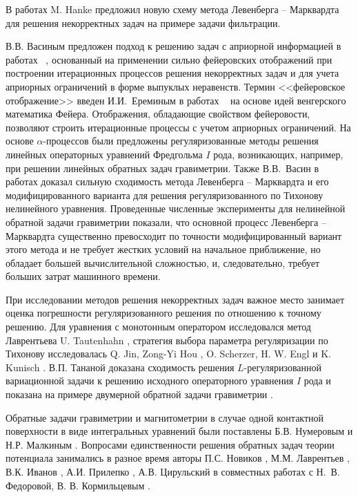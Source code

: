 {В работах \cite{Han1997,Han2010} M. Hanke предложил новую схему метода Левенберга -- Марквардта для решения некорректных задач на примере задачи фильтрации.

В.В. Васиным предложен подход к решению задач с априорной информацией в работах ~\cite{Vas1982, Vas1988,VasAge1993, VasEre2009}, основанный на применении сильно фейеровских отображений при построении итерационных процессов решения некорректных задач и для учета априорных ограничений в форме выпуклых неравенств. Термин <<фейеровское отображение>> введен И.И.~Ереминым в работах ~\cite{Ere1965, Ere1966, Ere1968} на основе идей венгерского математика Фейера. Отображения, обладающие свойством фейеровости, позволяют строить итерационные процессы с учетом априорных ограничений. На основе $\alpha$-процессов были предложены регуляризованные методы решения линейных операторных уравнений Фредгольма $I$ рода, возникающих, например, при решении линейных обратных задач гравиметрии. Также В.В.~Васин в работах \cite{VasPer_2011,Vasin_2012} доказал сильную сходимость метода Левенберга -- Марквардта и его модифицированного варианта для решения регуляризованного по Тихонову нелинейного уравнения. Проведенные численные эксперименты для нелинейной обратной задачи гравиметрии показали, что основной процесс Левенберга -- Марквардта существенно превосходит по точности модифицированный вариант этого метода и не требует жестких условий на начальное приближение, но обладает большей вычислительной сложностью, и, следовательно, требует больших затрат машинного времени.

При исследовании методов решения некорректных задач важное место занимает оценка погрешности регуляризованного решения по отношению к точному решению. Для уравнения с монотонным оператором исследовался метод Лаврентьева U. Tautenhahn \cite{Tau2002,Tau2004}, стратегия выбора параметра регуляризации по Тихонову исследовалась Q. Jin, Zong-Yi Hou \cite{JinZon1997,JinZon1999}, O. Scherzer, H. W. Engl и K. Kunisch \cite{SchEngKun1993}. В.П. Тананой доказана сходимость решения $L$-регуляризованной вариационной задачи к решению исходного операторного уравнения $I$ рода и показана на примере двумерной обратной задачи гравиметрии \cite{Tan2003_2}.

Обратные задачи гравиметрии и магнитометрии в случае одной контактной поверхности в виде интегральных уравнений были поставлены Б.В. Нумеровым и Н.Р. Малкиным \cite{Num1930, Mal1931}. Вопросами единственности решения обратных задач теории потенциала занимались в разное время авторы П.С. Новиков \cite{Nov1938}, М.М. Лаврентьев \cite{Lavr1956}, В.К. Иванов \cite{Iv1962_1}, А.И. Прилепко \cite{Pri1965}, А.В. Цирульский в совместных работах с Н.~В.~ Федоровой, В. В. Кормильцевым \cite{FedTsi1976,TsiKor1990}.

}
